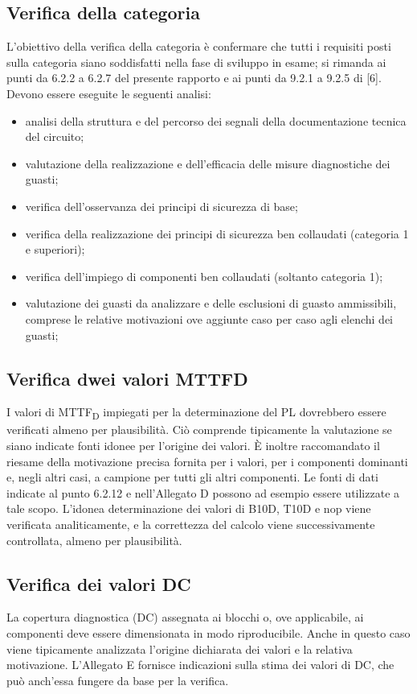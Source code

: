 \subsection{Verifica della categoria}
\label{subsec:07-4-1}
L'obiettivo della verifica della categoria è confermare che tutti i requisiti posti sulla categoria siano soddisfatti nella fase di sviluppo in esame; si rimanda ai punti da 6.2.2 a 6.2.7 del presente rapporto e ai punti da 9.2.1 a 9.2.5 di [6].
Devono essere eseguite le seguenti analisi:
\begin{itemize}
    \item analisi della struttura e del percorso dei segnali della documentazione tecnica del circuito;
    \item valutazione della realizzazione e dell'efficacia delle misure diagnostiche dei guasti;
    \item verifica dell'osservanza dei principi di sicurezza di base;
    \item verifica della realizzazione dei principi di sicurezza ben collaudati (categoria 1 e superiori);
    \item verifica dell'impiego di componenti ben collaudati (soltanto categoria 1);
    \item valutazione dei guasti da analizzare e delle esclusioni di guasto ammissibili, comprese le relative motivazioni ove aggiunte caso per caso agli elenchi dei guasti;
\end{itemize}

\subsection{Verifica dwei valori MTTFD}
\label{subsec:07-4-2}
I valori di MTTF\textsubscript{D} impiegati per la determinazione del PL dovrebbero essere verificati almeno per plausibilità. Ciò comprende tipicamente la valutazione se siano indicate fonti idonee per l'origine dei valori. È inoltre raccomandato il riesame della motivazione precisa fornita per i valori, per i componenti dominanti e, negli altri casi, a campione per tutti gli altri componenti. Le fonti di dati indicate al punto 6.2.12 e nell'Allegato D possono ad esempio essere utilizzate a tale scopo. L'idonea determinazione dei valori di B10D, T10D e nop viene verificata analiticamente, e la correttezza del calcolo viene successivamente controllata, almeno per plausibilità.

\subsection{Verifica dei valori DC}
\label{subsec:07-4-3}
La copertura diagnostica (DC) assegnata ai blocchi o, ove applicabile, ai componenti deve essere dimensionata in modo riproducibile. Anche in questo caso viene tipicamente analizzata l'origine dichiarata dei valori e la relativa motivazione. L'Allegato E fornisce indicazioni sulla stima dei valori di DC, che può anch'essa fungere da base per la verifica.

